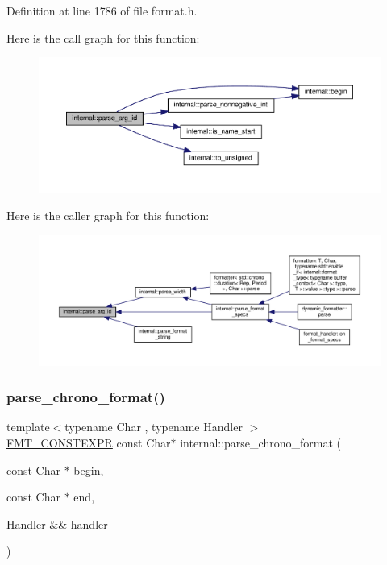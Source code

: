 Definition at line 1786 of file format.\+h.

Here is the call graph for this function\+:
\nopagebreak
\begin{figure}[H]
\begin{center}
\leavevmode
\includegraphics[width=350pt]{namespaceinternal_a0f424657f3b1900377b8597f5516432e_cgraph}
\end{center}
\end{figure}
Here is the caller graph for this function\+:
\nopagebreak
\begin{figure}[H]
\begin{center}
\leavevmode
\includegraphics[width=350pt]{namespaceinternal_a0f424657f3b1900377b8597f5516432e_icgraph}
\end{center}
\end{figure}
\mbox{\label{namespaceinternal_adb293fc437669ac43eac0ca61734db90}} 
\subsubsection{\texorpdfstring{parse\+\_\+chrono\+\_\+format()}{parse\_chrono\_format()}}
{\footnotesize\ttfamily template$<$typename Char , typename Handler $>$ \\
\hyperlink{core_8h_a69201cb276383873487bf68b4ef8b4cd}{F\+M\+T\+\_\+\+C\+O\+N\+S\+T\+E\+X\+PR} const Char$\ast$ internal\+::parse\+\_\+chrono\+\_\+format (\begin{DoxyParamCaption}\item[{const Char $\ast$}]{begin,  }\item[{const Char $\ast$}]{end,  }\item[{Handler \&\&}]{handler }\end{DoxyParamCaption})}



